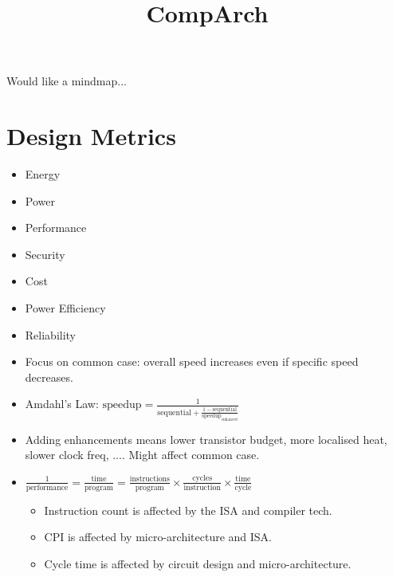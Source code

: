 \documentclass[a4paper, 11pt]{article}
\title{\vspace{-2.5cm}CompArch\vspace{-2cm}}
\author{}
\date{}
\begin{document}
\maketitle

Would like a mindmap...

\section*{Design Metrics}
{ 
    \begin{minipage}[t]{0.25\textwidth}
    \begin{itemize}
    \item Energy
    \item Power
    \item Performance
    \item Security
    \item Cost
    \item Power Efficiency
    \item Reliability
    \end{itemize}
    \end{minipage}
    \begin{minipage}[t]{0.7\textwidth}
    \setlength{\parskip}{8pt}
    \begin{itemize}
    \item Focus on common case: overall speed increases even if specific speed decreases.
    \item Amdahl's Law: \(\text{speedup} = \frac{1}{\text{sequential} + \frac{1 - \text{sequential}}{\text{speedup}_\text{enhanced}}}\)
    \item Adding enhancements means lower transistor budget, more localised heat, slower clock freq, .... Might affect common case.
    \item
    {
        \(\displaystyle \frac{1}{\text{performance}} = \frac{\text{time}}{\text{program}} = \frac{\text{instructions}}{\text{program}} \times \frac{\text{cycles}}{\text{instruction}} \times \frac{\text{time}}{\text{cycle}}\)

        \begin{itemize}
        \item Instruction count is affected by the ISA and compiler tech.
        \item CPI is affected by micro-architecture and ISA.
        \item Cycle time is affected by circuit design and micro-architecture.
        \end{itemize}
    }
    \end{itemize}
    \end{minipage}
}
\end{document}
